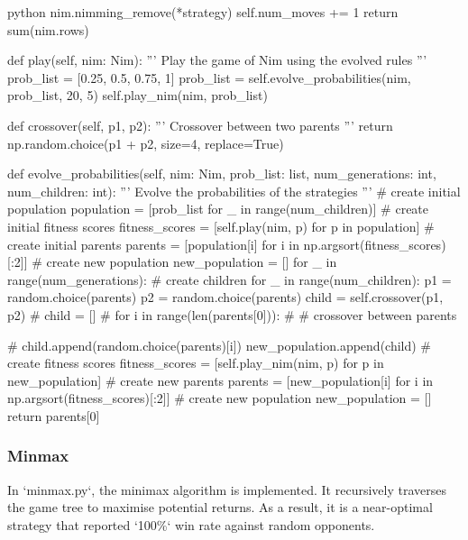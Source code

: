 \begin{mintedbox}{python}
            nim.nimming_remove(*strategy)
            self.num_moves += 1
            return sum(nim.rows)

        def play(self, nim: Nim):
            '''
            Play the game of Nim using the evolved rules
            '''
            prob_list = [0.25, 0.5, 0.75, 1]
            prob_list = self.evolve_probabilities(nim, prob_list, 20, 5)
            self.play_nim(nim, prob_list)

        def crossover(self, p1, p2):
            '''
            Crossover between two parents
            '''
            return np.random.choice(p1 + p2, size=4, replace=True)

        def evolve_probabilities(self, nim: Nim, prob_list: list, num_generations: int, num_children: int):
            '''
            Evolve the probabilities of the strategies
            '''
            # create initial population
            population = [prob_list for _ in range(num_children)]
            # create initial fitness scores
            fitness_scores = [self.play(nim, p) for p in population]
            # create initial parents
            parents = [population[i] for i in np.argsort(fitness_scores)[:2]]
            # create new population
            new_population = []
            for _ in range(num_generations):
                # create children
                for _ in range(num_children):
                    p1 = random.choice(parents)
                    p2 = random.choice(parents)
                    child = self.crossover(p1, p2)
                    # child = []
                    # for i in range(len(parents[0])):
                    #     # crossover between parents

                    #     child.append(random.choice(parents)[i])
                    new_population.append(child)
                # create fitness scores
                fitness_scores = [self.play_nim(nim, p) for p in new_population]
                # create new parents
                parents = [new_population[i] for i in np.argsort(fitness_scores)[:2]]
                # create new population
                new_population = []
            return parents[0]
\end{mintedbox}

\subsubsection{Minmax}

In `minmax.py`, the minimax algorithm is implemented. It recursively traverses the game tree to maximise potential returns. As a result, it is a near-optimal strategy that reported `100\%` win rate against random opponents.

